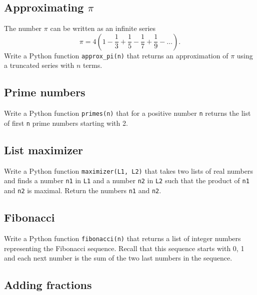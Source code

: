 
\subsection{Approximating $\pi$}

The number $\pi$ can be written as an infinite series 
$$
\pi = 4\left(1 - \frac{1}{3} + \frac{1}{5} - \frac{1}{7} + \frac{1}{9} - \ldots     \right).
$$
Write a Python function {\tt approx\_pi(n)} that returns an approximation 
of $\pi$ using a truncated series with $n$ terms.


\subsection{Prime numbers}

Write a Python function {\tt primes(n)} that for a positive number {\tt n} returns the list 
of first {\tt n} prime numbers starting with 2. 


\subsection{List maximizer}

Write a Python function {\tt maximizer(L1, L2)} that takes two lists of real numbers and 
finds a number {\tt n1} in {\tt L1} and a number {\tt n2} in {\tt L2} such that the product 
of {\tt n1} and {\tt n2} is maximal. Return the numbers {\tt n1} and {\tt n2}.


\subsection{Fibonacci}

Write a Python function {\tt fibonacci(n)} that returns a list of integer numbers representing 
the Fibonacci sequence. Recall that this sequence starts with 0, 1 and each next number is the 
sum of the two last numbers in the sequence. 


\subsection{Adding fractions}

